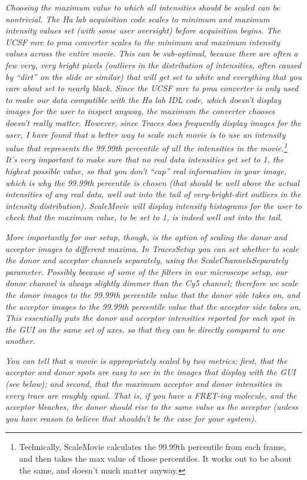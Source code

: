 \documentclass[11pt]{article}
\begin{document}
{\it Choosing the maximum value to which all intensities should be scaled can be nontrivial. The Ha lab acquisition code scales to minimum and maximum intensity values set (with some user oversight) before acquisition begins.  The UCSF mrc to pma converter scales to the minimum and maximum intensity values across the entire movie.  This can be  sub-optimal, because there are often a few very, very bright pixels (outliers in the distribution of intensities, often caused by ``dirt'' on the slide or similar) that will get set to white and everything that you care about set to nearly black.  Since the UCSF mrc to pma converter is only used to make our data compatible with the Ha lab IDL code, which doesn't display images for the user to inspect anyway, the maximum the converter chooses doesn't really matter.  However, since Traces does frequently display images for the user, I have found that a better way to scale each movie is to use an intensity value that represents the 99.99th percentile of all the intensities in the movie.\footnote{Technically, ScaleMovie calculates the 99.99th percentile from each frame, and then takes the max value of those percentiles.  It works out to be about the same, and doesn't much matter anyway.}  It's very important to make sure that no real data intensities get set to 1, the highest possible value, so that you don't ``cap'' real information in your image, which is why the 99.99th percentile is chosen (that should be well above the actual intensities of any real data, well out into the tail of very-bright-dirt outliers in the intensity distribution). ScaleMovie will display intensity histograms for the user to check that the maximum value, to be set to 1, is indeed well out into the tail.}

{\it More importantly for our setup, though, is the option of scaling the donor and acceptor images to different maxima.  In TracesSetup you can set whether to scale the donor and acceptor channels separately, using the ScaleChannelsSeparately parameter.  Possibly because of some of the filters in our microscope setup, our donor channel is always slightly dimmer than the Cy5 channel; therefore we scale the donor images to the 99.99th percentile value that the donor side takes on, and the acceptor images to the 99.99th percentile value that the acceptor side takes on.  This essentially puts the donor and acceptor intensities reported for each spot in the GUI on the same set of axes, so that they can be directly compared to one another.  }

{\it You can tell that a movie is appropriately scaled by two metrics: first, that the acceptor and donor spots are easy to see in the images that display with the GUI (see below); and second, that the maximum acceptor and donor intensities in every trace are roughly equal.  That is, if you have a FRET-ing molecule, and the acceptor bleaches, the donor should rise to the same value as the acceptor (unless you have reason to believe that shouldn't be the case for your system).}
\end{document}
